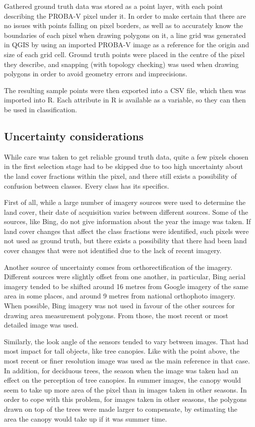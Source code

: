 \documentclass[a4paper,10pt]{book}
\begin{document}
Gathered ground truth data was stored as a point layer, with each point describing the PROBA-V pixel under it. In order to make certain that there are no issues with points falling on pixel borders, as well as to accurately know the boundaries of each pixel when drawing polygons on it, a line grid was generated in QGIS by using an imported PROBA-V image as a reference for the origin and size of each grid cell. Ground truth points were placed in the centre of the pixel they describe, and snapping (with topology checking) was used when drawing polygons in order to avoid geometry errors and imprecisions.

The resulting sample points were then exported into a CSV file, which then was imported into R. Each attribute in R is available as a variable, so they can then be used in classification.

\subsection{Uncertainty considerations}

While care was taken to get reliable ground truth data, quite a few pixels chosen in the first selection stage had to be skipped due to too high uncertainty about the land cover fractions within the pixel, and there still exists a possibility of confusion between classes. Every class has its specifics.

First of all, while a large number of imagery sources were used to determine the land cover, their date of acquisition varies between different sources. Some of the sources, like Bing, do not give information about the year the image was taken. If land cover changes that affect the class fractions were identified, such pixels were not used as ground truth, but there exists a possibility that there had been land cover changes that were not identified due to the lack of recent imagery.

Another source of uncertainty comes from orthorectification of the imagery. Different sources were slightly offset from one another, in particular, Bing aerial imagery tended to be shifted around 16 metres from Google imagery of the same area in some places, and around 9 metres from national orthophoto imagery. When possible, Bing imagery was not used in favour of the other sources for drawing area measurement polygons. From those, the most recent or most detailed image was used.

Similarly, the look angle of the sensors tended to vary between images. That had most impact for tall objects, like tree canopies. Like with the point above, the most recent or finer resolution image was used as the main reference in that case. In addition, for deciduous trees, the season when the image was taken had an effect on the perception of tree canopies. In summer images, the canopy would seem to take up more area of the pixel than in images taken in other seasons. In order to cope with this problem, for images taken in other seasons, the polygons drawn on top of the trees were made larger to compensate, by estimating the area the canopy would take up if it was summer time.
\end{document}
